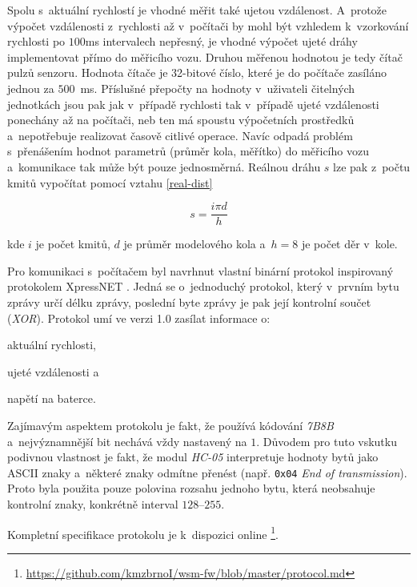 Spolu s~aktuální rychlostí je vhodné měřit také ujetou vzdálenost. A~protože
výpočet vzdálenosti z~rychlosti až v~počítači by mohl být vzhledem k~vzorkování
rychlosti po $100$ms intervalech nepřesný, je vhodné výpočet ujeté dráhy
implementovat přímo do měřicího vozu. Druhou měřenou hodnotou je tedy čítač
pulzů senzoru. Hodnota čítače je 32-bitové číslo, které je do počítače zasíláno
jednou za $500$~ms. Příslušné přepočty na hodnoty v~uživateli čitelných
jednotkách jsou pak jak v~případě rychlosti tak v~případě ujeté vzdálenosti
ponechány až na počítači, neb ten má spoustu výpočetních prostředků
a~nepotřebuje realizovat časově citlivé operace. Navíc odpadá problém
s~přenášením hodnot parametrů (průměr kola, měřítko) do měřicího vozu
a~komunikace tak může být pouze jednosměrná. Reálnou dráhu $s$ lze pak z~počtu
kmitů vypočítat pomocí vztahu \ref{real-dist}

\begin{equation}
s = \frac{i \pi d}{h}
\label{real-dist}
\end{equation}

kde $i$ je počet kmitů, $d$ je průměr modelového kola a~$h = 8$ je počet děr
v~kole.

Pro komunikaci s~počítačem byl navrhnut vlastní binární protokol inspirovaný
protokolem XpressNET \cite{xpressnet-specs}. Jedná se o~jednoduchý protokol, který
v~prvním bytu zprávy určí délku zprávy, poslední byte zprávy je pak její
kontrolní součet (\textit{XOR}). Protokol umí ve verzi 1.0 zasílat informace o:

\begin{compactenum}
\item aktuální rychlosti,
\item ujeté vzdálenosti a
\item napětí na baterce.
\end{compactenum}

Zajímavým aspektem protokolu je fakt, že používá kódování \textit{7B8B}
a~nejvýznamnější bit nechává vždy nastavený na $1$. Důvodem pro tuto vskutku podivnou
vlastnost je fakt, že modul \textit{HC-05} interpretuje hodnoty bytů jako
ASCII znaky a~některé znaky odmítne přenést (např. \texttt{0x04} \textit{End
of transmission}). Proto byla použita pouze polovina rozsahu jednoho
bytu, která neobsahuje kontrolní znaky, konkrétně interval $128$--$255$.

Kompletní specifikace protokolu je k~dispozici online
\footnote{\url{https://github.com/kmzbrnoI/wsm-fw/blob/master/protocol.md}}.

